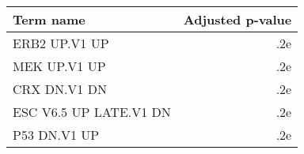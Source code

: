 \begin{tabular}{lr}
\toprule
             Term name &  Adjusted p-value \\
\midrule
         ERB2 UP.V1 UP &               .2e \\
          MEK UP.V1 UP &               .2e \\
          CRX DN.V1 DN &               .2e \\
ESC V6.5 UP LATE.V1 DN &               .2e \\
          P53 DN.V1 UP &               .2e \\
\bottomrule
\end{tabular}
